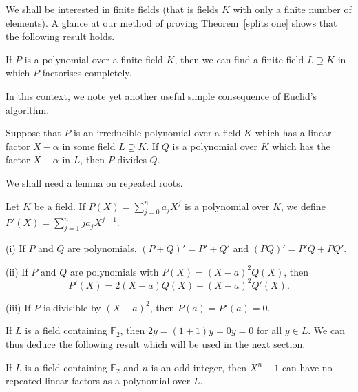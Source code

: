 We shall be interested in finite fields (that is
fields $K$ with only a finite number of elements).
A glance at our method of proving Theorem~\ref{splits one}
shows that the following result holds.
\begin{lemma}\label{splits two}
If $P$ is a polynomial over a finite field $K$,
then we can find a finite field $L\supseteq K$
in which $P$ factorises completely.
\end{lemma}

In this context, we note yet another useful
simple consequence of Euclid's algorithm.
\begin{lemma} Suppose that
$P$ is an irreducible
polynomial over a field $K$
which has a linear factor $X-\alpha$
in some field $L\supseteq K$.
If $Q$ is a polynomial over $K$ which
has the factor $X-\alpha$ in $L$,
then $P$ divides $Q$.
\end{lemma}

We shall need a lemma on repeated roots.
\begin{lemma} Let $K$ be a field. If
$P(X)=\sum_{j=0}^{n}a_{j}X^{j}$ is a polynomial
over $K$, we define $P'(X)=\sum_{j=1}^{n}ja_{j}X^{j-1}$.

(i) If $P$ and $Q$ are polynomials, $(P+Q)'=P'+Q'$
and $(PQ)'=P'Q+PQ'$.

(ii) If $P$ and $Q$ are polynomials with
$P(X)=(X-a)^{2}Q(X)$, then
\[P'(X)=2(X-a)Q(X)+(X-a)^{2}Q'(X).\]

(iii) If $P$ is divisible by $(X-a)^{2}$, then $P(a)=P'(a)=0$.
\end{lemma}

If $L$ is a field containing ${\mathbb F}_{2}$, then
$2y=(1+1)y=0y=0$ for all $y\in L$. We can thus
deduce the following result which will be used
in the next section.
\begin{lemma}\label{no repeat}
If $L$ is a field containing ${\mathbb F}_{2}$
and $n$ is an odd integer, then
$X^{n}-1$ can have no repeated linear factors
as a polynomial over $L$.
\end{lemma}

